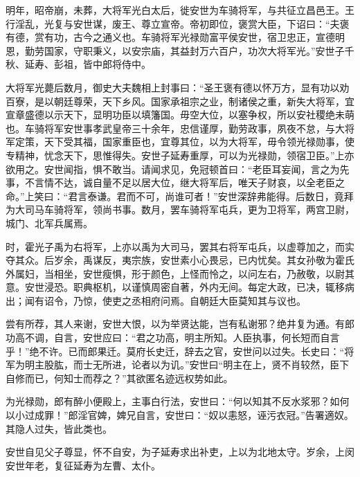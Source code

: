 \documentclass[12pt,UTF8]{ctexbook}
\begin{document}
明年，昭帝崩，未葬，大将军光白太后，徙安世为车骑将军，与共征立昌邑王。王行淫乱，光复与安世谋，废王、尊立宣帝。帝初即位，褒赏大臣，下诏曰：“夫褒有德，赏有功，古今之通义也。车骑将军光禄勋富平侯安世，宿卫忠正，宣德明恩，勤劳国家，守职秉义，以安宗庙，其益封万六百户，功次大将军光。”安世子千秋、延寿、彭祖，皆中郎将侍中。



大将军光薨后数月，御史大夫魏相上封事曰：“圣王褒有德以怀万方，显有功以劝百寮，是以朝廷尊荣，天下乡风。国家承祖宗之业，制诸侯之重，新失大将军，宜宣章盛德以示天下，显明功臣以填籓国。毋空大位，以塞争权，所以安社稷绝未萌也。车骑将军安世事孝武皇帝三十余年，忠信谨厚，勤劳政事，夙夜不怠，与大将军定策，天下受其福，国家重臣也，宜尊其位，以为大将军，毋令领光禄勋事，使专精神，忧念天下，思惟得失。安世子延寿重厚，可以为光禄勋，领宿卫臣。”上亦欲用之。安世闻指，惧不敢当。请闻求见，免冠顿首曰：“老臣耳妄闻，言之为先事，不言情不达，诚自量不足以居大位，继大将军后，唯天子财哀，以全老臣之命。”上笑曰：“君言泰谦。君而不可，尚谁可者！”安世深辞弗能得。后数日，竟拜为大司马车骑将军，领尚书事。数月，罢车骑将军屯兵，更为卫将军，两宫卫尉，城门、北军兵属焉。



时，霍光子禹为右将军，上亦以禹为大司马，罢其右将军屯兵，以虚尊加之，而实夺其众。后岁余，禹谋反，夷宗族，安世素小心畏忌，已内忧矣。其女孙敬为霍氏外属妇，当相坐，安世瘦惧，形于颜色，上怪而怜之，以问左右，乃赦敬，以尉其意。安世浸恐。职典枢机，以谨慎周密自著，外内无间。每定大政，已决，辄移病出；闻有诏令，乃惊，使吏之丞相府问焉。自朝廷大臣莫知其与议也。



尝有所荐，其人来谢，安世大恨，以为举贤达能，岂有私谢邪？绝井复为通。有郎功高不调，自言，安世应曰：“君之功高，明主所知。人臣执事，何长短而自言乎！”绝不许。已而郎果迁。莫府长史迁，辞去之官，安世问以过失。长史曰：“将军为明主股肱，而士无所进，论者以为讥。”安世曰“明主在上，贤不肖较然，臣下自修而已，何知士而荐之？”其欲匿名迹远权势如此。



为光禄勋，郎有醉小便殿上，主事白行法，安世曰：“何以知其不反水浆邪？如何以小过成罪！”郎淫官婢，婢兄自言，安世曰：“奴以恚怒，诬污衣冠。”告署適奴。其隐人过失，皆此类也。



安世自见父子尊显，怀不自安，为子延寿求出补吏，上以为北地太守。岁余，上闵安世年老，复征延寿为左曹、太仆。
\end{document}

